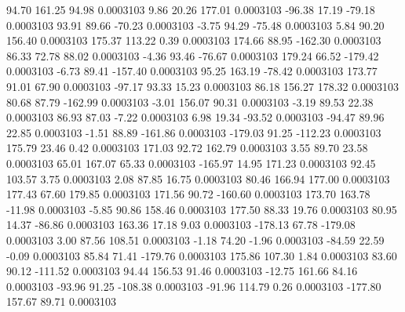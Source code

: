        94.70      161.25       94.98     0.0003103
        9.86       20.26      177.01     0.0003103
      -96.38       17.19      -79.18     0.0003103
       93.91       89.66      -70.23     0.0003103
       -3.75       94.29      -75.48     0.0003103
        5.84       90.20      156.40     0.0003103
      175.37      113.22        0.39     0.0003103
      174.66       88.95     -162.30     0.0003103
       86.33       72.78       88.02     0.0003103
       -4.36       93.46      -76.67     0.0003103
      179.24       66.52     -179.42     0.0003103
       -6.73       89.41     -157.40     0.0003103
       95.25      163.19      -78.42     0.0003103
      173.77       91.01       67.90     0.0003103
      -97.17       93.33       15.23     0.0003103
       86.18      156.27      178.32     0.0003103
       80.68       87.79     -162.99     0.0003103
       -3.01      156.07       90.31     0.0003103
       -3.19       89.53       22.38     0.0003103
       86.93       87.03       -7.22     0.0003103
        6.98       19.34      -93.52     0.0003103
      -94.47       89.96       22.85     0.0003103
       -1.51       88.89     -161.86     0.0003103
     -179.03       91.25     -112.23     0.0003103
      175.79       23.46        0.42     0.0003103
      171.03       92.72      162.79     0.0003103
        3.55       89.70       23.58     0.0003103
       65.01      167.07       65.33     0.0003103
     -165.97       14.95      171.23     0.0003103
       92.45      103.57        3.75     0.0003103
        2.08       87.85       16.75     0.0003103
       80.46      166.94      177.00     0.0003103
      177.43       67.60      179.85     0.0003103
      171.56       90.72     -160.60     0.0003103
      173.70      163.78      -11.98     0.0003103
       -5.85       90.86      158.46     0.0003103
      177.50       88.33       19.76     0.0003103
       80.95       14.37      -86.86     0.0003103
      163.36       17.18        9.03     0.0003103
     -178.13       67.78     -179.08     0.0003103
        3.00       87.56      108.51     0.0003103
       -1.18       74.20       -1.96     0.0003103
      -84.59       22.59       -0.09     0.0003103
       85.84       71.41     -179.76     0.0003103
      175.86      107.30        1.84     0.0003103
       83.60       90.12     -111.52     0.0003103
       94.44      156.53       91.46     0.0003103
      -12.75      161.66       84.16     0.0003103
      -93.96       91.25     -108.38     0.0003103
      -91.96      114.79        0.26     0.0003103
     -177.80      157.67       89.71     0.0003103
